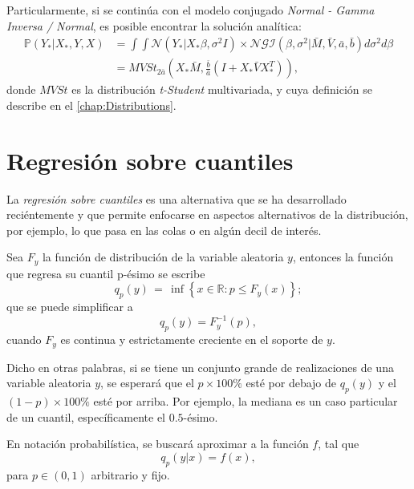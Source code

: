 Particularmente, si se contin\'ua con el modelo conjugado \textit{Normal - Gamma Inversa / Normal}, es posible encontrar la soluci\'on anal\'itica:
\begin{equation*}
\begin{aligned}
    \mathbb{P}(Y_*|X_*,Y,X)
    &= \int \int \mathcal{N}(Y_*|X_*\beta,\sigma^2I) \times \mathcal{NGI}(\beta,\sigma^2|\bar{M},\bar{V},\bar{a},\bar{b}) d\sigma^2 d\beta \\
    &= MVSt_{2\bar{a}} 
       \left(
        X_*\bar{M},\frac{\bar{b}}{\bar{a}}\left(I + X_*\bar{V}X_*^T\right)
       \right),
\end{aligned}
\end{equation*}
donde $MVSt$ es la distribuci\'on \textit{t-Student} multivariada, y cuya definici\'on se describe en el \autoref{chap:Distributions}.

\section{Regresión sobre cuantiles}

La \textit{regresi\'on sobre cuantiles} es una alternativa que se ha desarrollado reci\'entemente y que permite enfocarse en aspectos alternativos de la distribuci\'on, por ejemplo, lo que pasa en las colas o en alg\'un decil de inter\'es. 

\begin{defin}
Sea $F_y$ la funci\'on de distribuci\'on de la variable aleatoria $y$, entonces la funci\'on que regresa su cuantil p-\'esimo se escribe
\begin{equation*}
    q_p(y)\,=\,\inf \left\{x\in {\mathbb  {R}}:p\leq F_y(x)\right\};
\end{equation*}
que se puede simplificar a
\begin{equation*}
    q_p(y)=F_y^{-1}(p),
\end{equation*}
cuando $F_y$ es continua y estrictamente creciente en el soporte de $y$.
\end{defin}
Dicho en otras palabras, si se tiene un conjunto grande de realizaciones de una variable aleatoria $y$, se esperar\'a que el $p \times 100\%$ est\'e por debajo de $q_p(y)$ y el $(1-p) \times 100\%$ est\'e por arriba. Por ejemplo, la mediana es un caso particular de un cuantil, espec\'ificamente el $0.5$-\'esimo. 

En notaci\'on probabil\'istica, se buscar\'a aproximar a la funci\'on $f$, tal que 
\begin{equation*}
    q_p(y|x) = f(x),
\end{equation*}
para $p \in (0,1)$ arbitrario y fijo.

